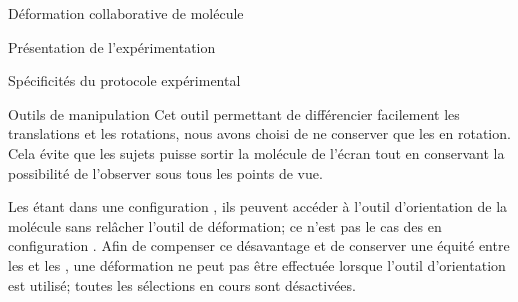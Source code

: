 \documentclass[myfrancais,ngerman,english,frenchb]{mythesis}
\begin{document}
\begin{mychapter}{Déformation collaborative de molécule}
\begin{mysection}{Présentation de l'expérimentation}
\begin{mysubsection}{Spécificités du protocole expérimental}
\begin{mysubsubsection}{Outils de manipulation}
					Cet outil permettant de différencier facilement les translations et les rotations, nous avons choisi de ne conserver que les  en rotation.
					Cela évite que les sujets puisse sortir la molécule de l'écran tout en conservant la possibilité de l'observer sous tous les points de vue.

					Les  étant dans une configuration , ils peuvent accéder à l'outil d'orientation de la molécule sans relâcher l'outil de déformation; ce n'est pas le cas des  en configuration .
					Afin de compenser ce désavantage et de conserver une équité entre les  et les , une déformation ne peut pas être effectuée lorsque l'outil d'orientation est utilisé; toutes les sélections en cours sont désactivées.


\end{mysubsubsection}
\end{mysubsection}
\end{mysection}
\end{mychapter}
\end{document}
